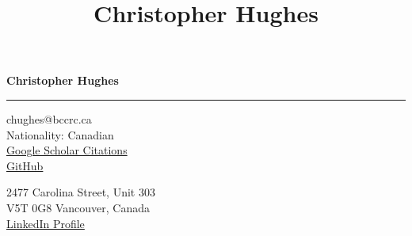 \documentclass[11pt]{article}
\title{\bfseries\Huge Christopher Hughes}
\author{}
\date{}
\begin{document}
	\newpage
	\setcounter{page}{2}
	\noindent

\begin{LARGE}

	\noindent\textbf{Christopher Hughes}\vspace{1pt}

\end{LARGE}


\noindent\rule{\textwidth}{1pt}\vspace{9pt}

\noindent
\begin{minipage}{0.5\textwidth}
	\begin{flushleft}
		chughes@bccrc.ca\\
		Nationality: Canadian\\ 
		\href{https://scholar.google.com/citations?user=jPSwBGwAAAAJ}{Google Scholar Citations}\\
		\href{https://github.com/chrishuges}{GitHub}
	\end{flushleft}
\end{minipage}%
\begin{minipage}{0.5\textwidth}
	\begin{flushright}
		2477 Carolina Street, Unit 303\\
		V5T 0G8 Vancouver, Canada\\ 
		\href{https://www.linkedin.com/in/christopher-hughes-612460133/}{LinkedIn Profile}
	\end{flushright}
\end{minipage}\vspace{6pt}
\end{document}
